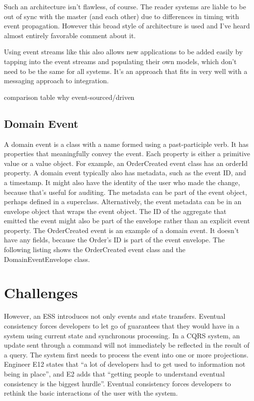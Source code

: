 Such an architecture isn't flawless, of course. The reader systems are liable to be out of sync with the master (and each other) due to differences in timing with event propagation. However this broad style of architecture is used and I've heard almost entirely favorable comment about it.

Using event streams like this also allows new applications to be added easily by tapping into the event streams and populating their own models, which don't need to be the same for all systems. It's an approach that fits in very well with a messaging approach to integration.


comparison table why event-sourced/driven \citep{richards2015software}


\subsection{Domain Event}

A domain event is a class with a name formed using a past-participle verb. It has properties that meaningfully convey the event. Each property is either a primitive value or a
value object. For example, an OrderCreated event class has an orderId property.
 A domain event typically also has metadata, such as the event ID, and a timestamp.
It might also have the identity of the user who made the change, because that’s useful
for auditing. The metadata can be part of the event object, perhaps defined in a
superclass. Alternatively, the event metadata can be in an envelope object that wraps
the event object. The ID of the aggregate that emitted the event might also be part of
the envelope rather than an explicit event property.
 The OrderCreated event is an example of a domain event. It doesn’t have any
fields, because the Order’s ID is part of the event envelope. The following listing
shows the OrderCreated event class and the DomainEventEnvelope class.~\citep{richardson2018microservices}

\section{Challenges}

However, an ESS introduces not only events and state transfers. Eventual consistency forces developers to let go of guarantees that they would have in a system using current state and synchronous processing. In a CQRS system, an update sent through a command will not immediately be reflected in the result of a query. The system first needs to process the event into one or more projections. Engineer E12 states that “a lot of developers had to get used to information not being in place”, and E2 adds that “getting people to understand eventual consistency is the biggest hurdle”. Eventual consistency forces developers to rethink the basic interactions of the user with the system.

